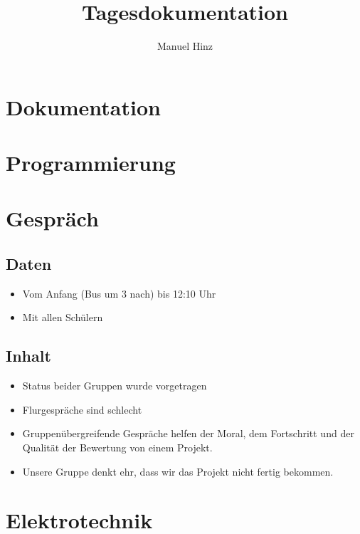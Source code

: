 \documentclass{article}
\author{Manuel Hinz}
\title{Tagesdokumentation}
\begin{document}
\maketitle

\section{Dokumentation}

\section{Programmierung}

\section{Gespräch}

\subsection{Daten}

\begin{itemize}

\item Vom Anfang (Bus um 3 nach) bis 12:10 Uhr

\item Mit allen Schülern

\end{itemize}

\subsection{Inhalt}

\begin{itemize}

\item Status beider Gruppen wurde vorgetragen

\item Flurgespräche sind schlecht

\item Gruppenübergreifende Gespräche helfen der Moral, dem Fortschritt und der Qualität der Bewertung von einem Projekt.

\item Unsere Gruppe denkt ehr, dass wir das Projekt nicht fertig bekommen.

\end{itemize}

\section{Elektrotechnik}
\end{document}
